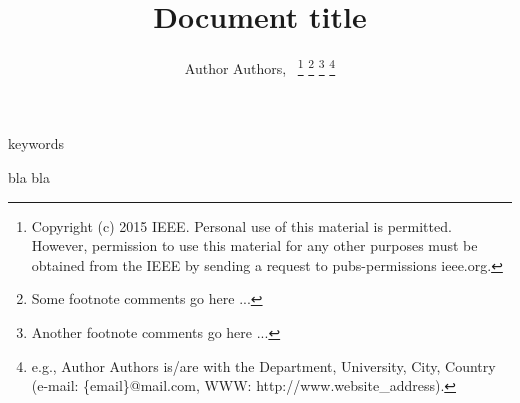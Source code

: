 \documentclass[10pt, conference, compsocconf]{IEEEtran}
\title{ Document title}
\author{Author Authors,~\IEEEmembership{Student/Member/Fellow,~IEEE}
\ifCLASSOPTIONdraftcls
\footnote{Copyright (c) 2015 IEEE. Personal use of this material is permitted. However, permission to use this material for any other purposes must be obtained from the IEEE by sending a request to pubs-permissions ieee.org.}
\fi
	\thanks{Some footnote comments go here ...}%
	\thanks{Another footnote comments go here ...}%
	\thanks{e.g., Author Authors is/are with the
			Department,
			University,
			City, Country (e-mail: \{email\}@mail.com,
			WWW: http://www.website\_address).}%
}
\begin{document}
	
	\maketitle
	
	\begin{IEEEkeywords}
	keywords
	\end{IEEEkeywords}
	
	\IEEEpeerreviewmaketitle
	
	bla bla \cite{DeBoor2001ParctGuideToSplines}
	
	
	\vspace{-5mm}
	
	
	
\end{document}
